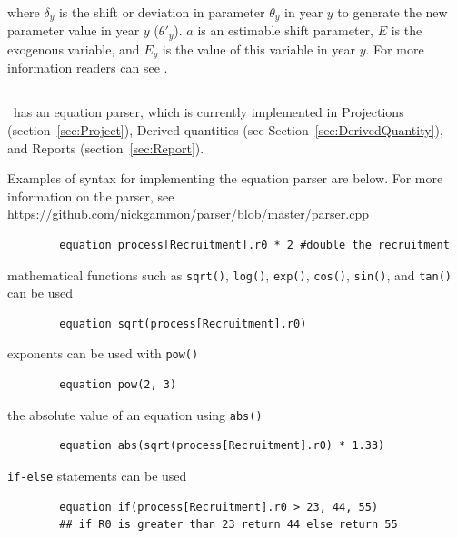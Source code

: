 where $\delta_y$ is the shift or deviation in parameter $\theta_y$ in year $y$ to generate the new parameter value in year $y$ ($\theta'_y$). $a$ is an estimable shift parameter, $E$ is the exogenous variable, and $E_y$ is the value of this variable in year $y$. For more information readers can see \cite{francis_03}.

\subsection{\label{sec:eq_parser}} 

\CNAME\ has an equation parser, which is currently implemented in Projections (section~\ref{sec:Project}), Derived quantities (see Section~\ref{sec:DerivedQuantity}), and Reports (section~\ref{sec:Report}).

Examples of syntax for implementing the equation parser are below. For more information on the parser, see \url{https://github.com/nickgammon/parser/blob/master/parser.cpp}


{\small{\begin{verbatim}
		equation process[Recruitment].r0 * 2 #double the recruitment
\end{verbatim}}}

mathematical functions such as \texttt{sqrt()}, \texttt{log()},  \texttt{exp()},  \texttt{cos()}, \texttt{sin()}, and \texttt{tan()} can be used

{\small{\begin{verbatim}
		equation sqrt(process[Recruitment].r0)
\end{verbatim}}}

exponents can be used with \texttt{pow()}

{\small{\begin{verbatim}
		equation pow(2, 3)
\end{verbatim}}}

the absolute value of an equation using \texttt{abs()}

{\small{\begin{verbatim}
		equation abs(sqrt(process[Recruitment].r0) * 1.33)
\end{verbatim}}}

\texttt{if-else} statements can be used

{\small{\begin{verbatim}
		equation if(process[Recruitment].r0 > 23, 44, 55)
		## if R0 is greater than 23 return 44 else return 55
\end{verbatim}}}

